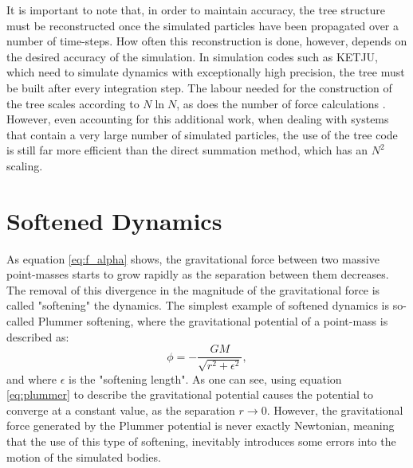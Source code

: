 \documentclass[english, twoside]{HYgradu}
\begin{document}
It is important to note that, in order to maintain accuracy, the tree structure must be reconstructed once the simulated particles have been propagated over a number of time-steps. How often this reconstruction is done, however, depends on the desired accuracy of the simulation. In simulation codes such as KETJU, which need to simulate dynamics with exceptionally high precision, the tree must be built after every integration step. The labour needed for the construction of the tree scales according to $N \ln N$, as does the number of force calculations \citep{BinneyTremaine}. However, even accounting for this additional work, when dealing with systems that contain a very large number of simulated particles, the use of the tree code is still far more efficient than the direct summation method, which has an $N^2$ scaling.

\section{Softened Dynamics} \label{section:softened_dynamics}

As equation \ref{eq:f_alpha} shows, the gravitational force between two massive point-masses starts to grow rapidly as the separation between them decreases. The removal of this divergence in the magnitude of the gravitational force is called "softening" the dynamics. The simplest example of softened dynamics is so-called Plummer softening, where the gravitational potential of a point-mass is described as:
\begin{equation}
\phi = -\frac{GM}{\sqrt{r^2 + \epsilon^2}}, \label{eq:plummer}
\end{equation}
and where $\epsilon$ is the "softening length". As one can see, using equation \ref{eq:plummer} to describe the gravitational potential causes the potential to converge at a constant value, as the separation $r \rightarrow 0$. However, the gravitational force generated by the Plummer potential is never exactly Newtonian, meaning that the use of this type of softening, inevitably introduces some errors into the motion of the simulated bodies.
\end{document}

